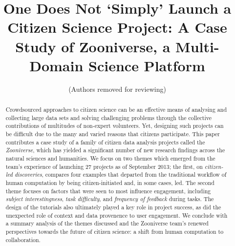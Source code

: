 \documentclass{sigchi}
\begin{document}
\title{One Does Not `Simply' Launch a Citizen Science Project: A Case Study of Zooniverse, a Multi-Domain Science Platform}

 \author{ (Authors removed for reviewing) }
% 
% 
% 


\maketitle

\begin{abstract}
Crowdsourced approaches to citizen science can be an effective means of analysing and collecting large data sets and solving challenging problems through the collective contributions of multitudes of non-expert volunteers. Yet, designing such projects can be difficult due to the many and varied reasons that citizens participate. This paper contributes a case study of a family of citizen data analysis projects called the \emph{Zooniverse}, which has yielded a significant number of new research findings across the natural sciences and humanities.  We focus on two themes which emerged from the team's experience of launching 27 projects as of September 2013; the first, on \emph{citizen-led discoveries}, compares four examples that departed from the traditional workflow of human computation by being citizen-initiated and, in some cases, led.  The second theme focuses on factors that were seen to most influence engagement, including \emph{subject interestingness}, \emph{task difficulty}, and \emph{frequency of feedback} during tasks.  The design of the tutorials also ultimately played a key role in project success, as did the unexpected role of context and data provenence to user engagement.  We conclude with a summary analysis of the themes discussed and the Zooniverse team's renewed perspectives towards the future of citizen science: a shift from human computation to collaboration.
\end{abstract}


\end{document}
